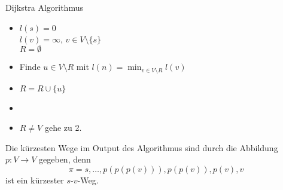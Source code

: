 \begin{algorithm}[H]
	\label{alg:dijkstra}
	\caption{Dijkstra Algorithmus}
\begin{itemize}
	\item $l(s)=0$ \\$l(v) = \infty$, $v \in V \setminus \{s\} $ \\$R=\emptyset$ 
	\item Finde $u \in V\setminus R$ mit $l(n)= \min_{v \in V \setminus R} l(v)$
	\item $R=R \cup \{u\} $ 
	\item {}
	\item $R \neq  V $ gehe zu 2. 
\end{itemize}
\end{algorithm}
\begin{remark}
Die kürzesten Wege im Output des Algorithmus sind durch die Abbildung $p \colon V \to V $ gegeben, denn
\[
	\pi=s,\ldots, p(p(p(v))),p(p(v)),p(v),v
\]
ist ein kürzester $s$-$v$-Weg.
\end{remark}
